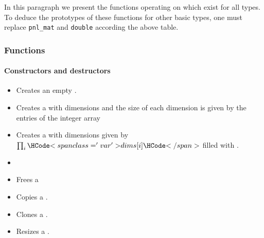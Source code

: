 In this paragraph we present the functions operating on 
which exist for all types. To deduce the prototypes of these functions for
other basic types, one must replace {\tt pnl_mat} and {\tt double} according
the above table.


\subsubsection{Functions}

\paragraph{Constructors and destructors}
\begin{itemize}
  \item {}
    \sshortdescribe Creates an empty .

\item {}
  \sshortdescribe Creates a  with  dimensions and
  the size of each dimension is given by the entries of the integer array
  
\item 
  \sshortdescribe Creates a  with  dimensions given
  by $\prod_i \var{dims[i]}$ filled with .
  
\item 
  
\item {}
  \sshortdescribe Frees a 
  
\item {}
  \sshortdescribe Copies a .
  
\item {}
  \sshortdescribe Clones a .
  
\item {}
  \sshortdescribe Resizes a .
\end{itemize}  

